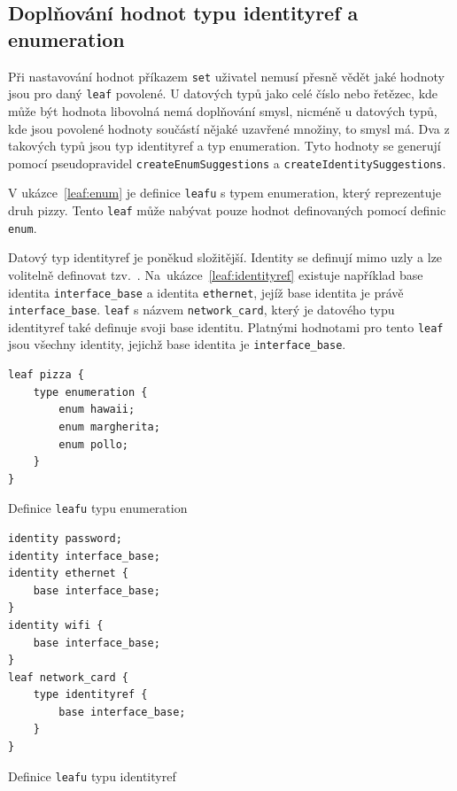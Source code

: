 \documentclass[thesis=B,czech,hidelinks]{FITthesis}[2019/03/06]
\begin{document}
\subsection{Doplňování hodnot typu identityref a enumeration}
Při nastavování hodnot příkazem \texttt{set} uživatel nemusí přesně vědět jaké hodnoty jsou pro daný \texttt{leaf} povolené. U datových typů jako celé číslo nebo řetězec, kde může být hodnota libovolná nemá doplňování smysl, nicméně u datových typů, kde jsou povolené hodnoty součástí nějaké uzavřené množiny, to smysl má. Dva z takových typů jsou typ identityref a typ enumeration. Tyto hodnoty se generují pomocí pseudopravidel \texttt{createEnumSuggestions} a \texttt{createIdentitySuggestions}.

V ukázce~\ref{leaf:enum} je definice \texttt{leafu} s typem enumeration, který reprezentuje druh pizzy. Tento \texttt{leaf} může nabývat pouze hodnot definovaných pomocí definic \texttt{enum}.

Datový typ identityref je poněkud složitější. Identity se definují mimo uzly a lze volitelně definovat tzv.\ . Na~ukázce~\ref{leaf:identityref} existuje například base identita \texttt{interface\_base} a identita \texttt{ethernet}, jejíž base identita je právě \texttt{interface\_base}. \texttt{leaf} s názvem \texttt{network\_card}, který je datového typu identityref také definuje svoji base identitu. Platnými hodnotami pro tento \texttt{leaf} jsou všechny identity, jejichž base identita je \texttt{interface\_base}.

\begin{listing}[H]
        \begin{verbatim}
leaf pizza {
    type enumeration {
        enum hawaii;
        enum margherita;
        enum pollo;
    }
}
\end{verbatim}
\caption{Definice \texttt{leafu} typu enumeration}\label{leaf:enum}
\end{listing}

\begin{listing}[H]
\begin{verbatim}
identity password;
identity interface_base;
identity ethernet {
    base interface_base;
}
identity wifi {
    base interface_base;
}
leaf network_card {
    type identityref {
        base interface_base;
    }
}
\end{verbatim}
\caption{Definice \texttt{leafu} typu identityref}\label{leaf:identityref}
\end{listing}
\end{document}
